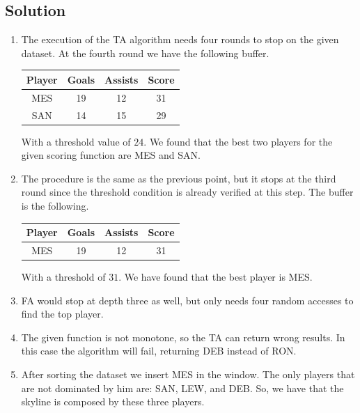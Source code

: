 \documentclass[12pt, a4paper]{report}
\newtheorem[style=M,bodystyle=\normalfont]{theorem}{Theorem}
\newtheorem[style=M,bodystyle=\normalfont]{corollary}{Corollary}
\newtheorem[style=M,bodystyle=\normalfont]{lemma}{Lemma}
\newtheorem[style=M,bodystyle=\normalfont]{definition}{Definition}
\begin{document}
    \subsection*{Solution}
        \begin{enumerate}
            \item The execution of the TA algorithm needs four rounds to stop on the given dataset. At the fourth 
                round we have the following buffer. 
                \begin{table}[H]
                    \centering
                    \begin{tabular}{c|cc|c}
                    \hline
                    \textbf{Player} & \textbf{Goals} & \textbf{Assists} & \textbf{Score} \\ \hline
                    MES             & 19             & 12               & 31             \\
                    SAN             & 14             & 15               & 29             \\ \hline
                    \end{tabular}
                \end{table}
                With a threshold value of $24$. We found that the best two players for the given scoring function
                are MES and SAN. 
            \item The procedure is the same as the previous point, but it stops at the third round since the threshold 
                condition is already verified at this step. The buffer is the following.
                \begin{table}[H]
                    \centering
                    \begin{tabular}{c|cc|c}
                    \hline
                    \textbf{Player} & \textbf{Goals} & \textbf{Assists} & \textbf{Score} \\ \hline
                    MES             & 19             & 12               & 31             \\ \hline
                    \end{tabular}
                \end{table}
                With a threshold of $31$. We have found that the best player is MES. 
            \item FA would stop at depth three as well, but only needs four random accesses to find the top player. 
            \item The given function is not monotone, so the TA can return wrong results. In this case the algorithm 
                will fail, returning DEB instead of RON. 
            \item After sorting the dataset we insert MES in the window. The only players that are not dominated by him
                are: SAN, LEW, and DEB. So, we have that the skyline is composed by these three players. 
        \end{enumerate}
\end{document}
